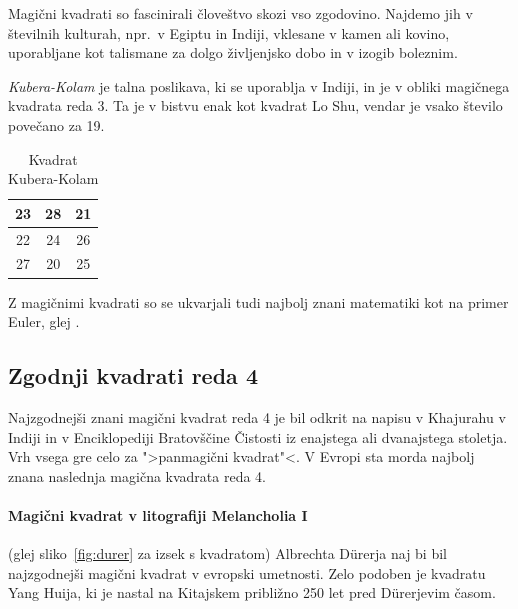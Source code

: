 \documentclass[a4paper,12pt]{article}
\theoremstyle{definition}
\theoremstyle{plain}
\newenvironment{magic}[3]
{\begin{table}[!ht]
   \centering
   \caption{#2}
   \label{#3}
   \large
   \begin{tabular}{|*{#1}{c|}}
   \hline
   }
{\end{tabular}
   \normalsize
\end{table}}
\begin{document}
Magični kvadrati so fascinirali človeštvo skozi vso zgodovino. Najdemo jih
v številnih kulturah, npr.\ v Egiptu in Indiji, vklesane v kamen ali
kovino, uporabljane kot talismane za dolgo življenjsko dobo in v
izogib boleznim.

\emph{Kubera-Kolam} je talna poslikava, ki se uporablja v Indiji, in je v
obliki magičnega kvadrata reda 3. Ta je v bistvu enak kot kvadrat
Lo Shu, vendar je vsako število povečano za 19.


\begin{magic}{3}{Kvadrat Kubera-Kolam}{table:kubera}
   23 & 28 & 21 \\\hline
   22 & 24 & 26 \\\hline
   27 & 20 & 25 \\\hline
\end{magic}

Z magičnimi kvadrati so se ukvarjali tudi najbolj znani matematiki kot na
primer Euler, glej \cite{euler}.


\subsection{Zgodnji kvadrati reda 4}

Najzgodnejši znani magični kvadrat reda 4 je bil odkrit na napisu
v Khajurahu v Indiji in v Enciklopediji Bratovščine Čistosti iz enajstega
ali dvanajstega stoletja. Vrh vsega gre celo za ">panmagični kvadrat"<.
V Evropi sta morda najbolj znana naslednja magična kvadrata reda 4.

\paragraph{Magični kvadrat v litografiji Melancholia I}
(glej sliko~\ref{fig:durer} za izsek s kvadratom) Albrechta Dürerja naj bi bil najzgodnejši magični kvadrat
v evropski umetnosti. Zelo podoben je kvadratu Yang Huija, ki je nastal na Kitajskem
približno 250 let pred Dürerjevim časom. %

\end{document}
